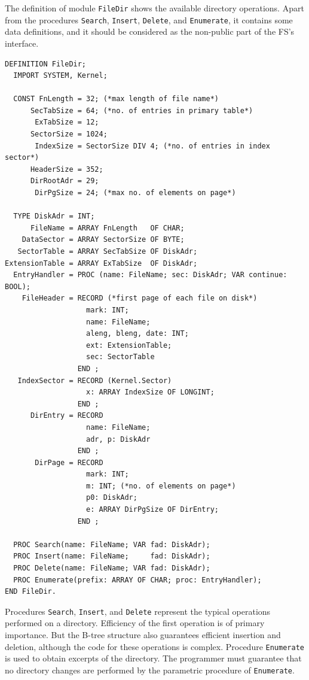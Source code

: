 The definition of module \verb|FileDir| shows the available directory operations. Apart from the
procedures \verb|Search|, \verb|Insert|, \verb|Delete|, and \verb|Enumerate|, it contains some data
definitions, and it should be considered as the non-public part of the FS's interface.
\begin{verbatim}
DEFINITION FileDir;
  IMPORT SYSTEM, Kernel;

  CONST FnLength = 32; (*max length of file name*)
      SecTabSize = 64; (*no. of entries in primary table*)
       ExTabSize = 12;
      SectorSize = 1024;
       IndexSize = SectorSize DIV 4; (*no. of entries in index sector*)
      HeaderSize = 352;
      DirRootAdr = 29;
       DirPgSize = 24; (*max no. of elements on page*)

  TYPE DiskAdr = INT;
      FileName = ARRAY FnLength   OF CHAR;
    DataSector = ARRAY SectorSize OF BYTE;
   SectorTable = ARRAY SecTabSize OF DiskAdr;
ExtensionTable = ARRAY ExTabSize  OF DiskAdr;
  EntryHandler = PROC (name: FileName; sec: DiskAdr; VAR continue: BOOL);
    FileHeader = RECORD (*first page of each file on disk*)
                   mark: INT;
                   name: FileName;
                   aleng, bleng, date: INT;
                   ext: ExtensionTable;
                   sec: SectorTable
                 END ;
   IndexSector = RECORD (Kernel.Sector)
                   x: ARRAY IndexSize OF LONGINT;
                 END ;
      DirEntry = RECORD
                   name: FileName;
                   adr, p: DiskAdr
                 END ;
       DirPage = RECORD
                   mark: INT;
                   m: INT; (*no. of elements on page*)
                   p0: DiskAdr;
                   e: ARRAY DirPgSize OF DirEntry;
                 END ;

  PROC Search(name: FileName; VAR fad: DiskAdr);
  PROC Insert(name: FileName;     fad: DiskAdr);
  PROC Delete(name: FileName; VAR fad: DiskAdr);
  PROC Enumerate(prefix: ARRAY OF CHAR; proc: EntryHandler);
END FileDir.
\end{verbatim}

Procedures \verb|Search|, \verb|Insert|, and \verb|Delete| represent the typical operations performed on a directory.
Efficiency of the first operation is of primary importance. But the B-tree structure also guarantees
efficient insertion and deletion, although the code for these operations is complex. Procedure
\verb|Enumerate| is used to obtain excerpts of the directory. The programmer must guarantee that no
directory changes are performed by the parametric procedure of \verb|Enumerate|.

